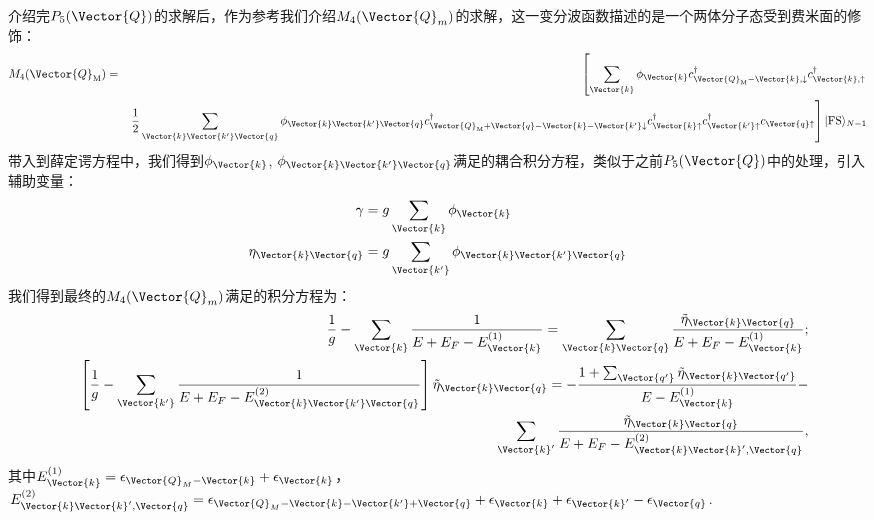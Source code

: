 介绍完$P_5(\Vector{Q})$的求解后，作为参考我们介绍$M_4(\Vector{Q}_m)$的求解，这一变分波函数描述的是一个两体分子态受到费米面的修饰：
\begin{eqnarray}
M_{4}({\Vector{Q}}_{\rm M})&=&\left[\sum_{{\Vector{k} }}\phi_{{\Vector{k} }} c^{\dag}_{{\Vector{Q}_{\rm M}}-{\Vector{k}},\downarrow}c^{\dag}_{\Vector{k},\uparrow} \right.  \\
&&\left.  \frac{1}{2} \sum_{{\Vector{k} }{\Vector{k'} } {\Vector{q} }}\phi_{{\Vector{k} }{\Vector{k'} }  {\Vector{q} } } c^{\dag}_{{\Vector{Q} }_{\rm M}+{\Vector{q} }-{\Vector{k} }-{\Vector{k'} } \downarrow} c^{\dag}_{{\Vector{k} }\uparrow}c^{\dag}_{{\Vector{k'} }\uparrow}c_{{\Vector{q} } \uparrow}\right] |{\rm FS}\rangle_{N-1}\\ \label{wf_m}
\end{eqnarray}
带入到薛定谔方程中，我们得到$\phi_{{\Vector{k} }}$, $\phi_{{\Vector{k} }{\Vector{k'} }  {\Vector{q} } }$满足的耦合积分方程，类似于之前$P_5(\Vector{Q})$中的处理，引入辅助变量：
\begin{equation}
\begin{split}
\gamma&=g\sum_{\Vector{k} } \phi_{\Vector{k} }\\
\eta_{{\Vector{k} }{\Vector{q} }}&=g\sum_{\Vector{k'} }\phi_{{\Vector{k} }{\Vector{k'} }{\Vector{q} }}\\
\end{split}
\end{equation}
我们得到最终的$M_4(\Vector{Q}_m)$满足的积分方程为：
\begin{eqnarray}
&&\frac{1}{g}-\sum_{\Vector{k} }\frac{1}{E+E_F-E^{(1)}_{{\Vector{k} }}}=\sum_{{\Vector{k} }{\Vector{q} }}  \frac{ \tilde{\eta}_{\Vector{k}\Vector{q}} }{ E+E_F-E^{(1)}_{\Vector{k}}} ;\\
&&\left[\frac{1}{g}-\sum_{\Vector{k'} }\frac{1}{E+E_F-E^{(2)}_{{\Vector{k} }{\Vector{k'} }{\Vector{q} }}}\right]\tilde{\eta}_{\Vector{k}\Vector{q}} = -\frac{1+\sum_{\Vector{q'} }\tilde{\eta}_{\Vector{k}\Vector{q'}} }{E-E^{(1)}_{\Vector{k} }}- \nonumber\\
&& \ \ \ \ \ \ \ \ \ \ \ \ \ \ \ \ \ \ \ \ \ \ \ \ \ \ \ \ \ \sum_{\Vector{k}'} \frac{ \tilde{\eta}_{\Vector{k}\Vector{q}} }{ E+E_F-E^{(2)}_{\Vector{k}\Vector{k}',\Vector{q}}},
\end{eqnarray}
其中$E^{(1)}_{\Vector{k} }=\epsilon_{{\Vector{Q} }_M-{\Vector{k} }}+\epsilon_{{\Vector{k} }}$，$E^{(2)}_{\Vector{k}\Vector{k}',\Vector{q}}=\epsilon_{{\Vector{Q} }_M-{\Vector{k} }-{\Vector{k'} }+{\Vector{q} }}+\epsilon_{{\Vector{k} }}+\epsilon_{{\Vector{k} }'}-\epsilon_{{\Vector{q} }}$.


